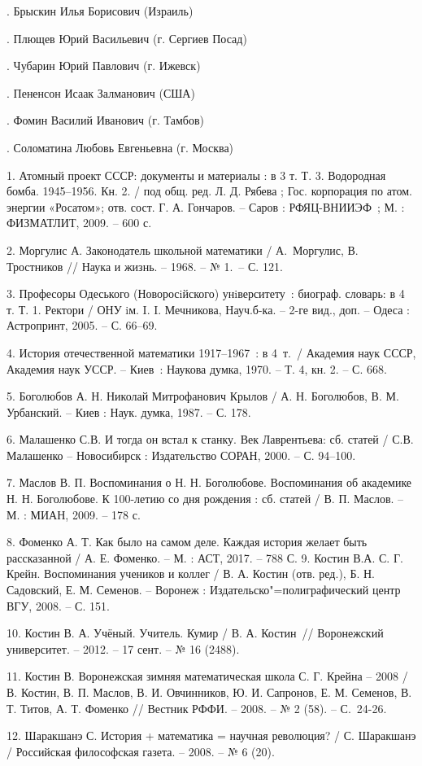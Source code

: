 .	Брыскин Илья Борисович (Израиль)

.	Плющев Юрий Васильевич (г. Сергиев Посад)

.	Чубарин Юрий Павлович (г. Ижевск)

.	Пененсон Исаак Залманович (США)

.	Фомин Василий Иванович (г. Тамбов)

.	Соломатина Любовь Евгеньевна (г. Москва)


\litlist

1.	Атомный проект СССР: документы и материалы : в 3 т. Т. 3. Водородная бомба. 1945–1956. Кн. 2. / под общ. ред. Л. Д. Рябева ; Гос. корпорация по атом. энергии «Росатом»; отв. сост. Г. А. Гончаров. – Саров : РФЯЦ-ВНИИЭФ~; М. : ФИЗМАТЛИТ, 2009. – 600 с.

2.	Моргулис А. Законодатель школьной математики / А.~Моргулис, В. Тростников // Наука и жизнь. – 1968. – № 1.~– С. 121.

3.	Професоры Одеського (Новоросiйского) унiверситету~: биограф. словарь:  в 4 т. Т. 1. Ректори / ОНУ iм. I. I. Мечникова, Науч.б-ка. – 2-ге вид., доп. – Одеса : Астропринт, 2005. – С. 66–69.

4.	История отечественной математики 1917–1967~: в 4~т.~/ Академия наук СССР, Академия наук УССР. – Киев~: Наукова думка, 1970. – Т. 4, кн. 2. – С. 668.

5.	Боголюбов А. Н. Николай Митрофанович Крылов / А. Н. Боголюбов, В. М. Урбанский. – Киев : Наук. думка, 1987. – С. 178.

6.	Малашенко С.В. И тогда он встал к станку. Век Лаврентьева: сб. статей / С.В. Малашенко – Новосибирск : Издательство СОРАН, 2000. –  С. 94–100.

7.	Маслов В. П. Воспоминания о Н. Н. Боголюбове. Воспоминания об академике Н. Н. Боголюбове. К 100-летию со дня рождения : сб. статей / В. П. Маслов. – М. : МИАН, 2009. – 178 с.

8.	Фоменко А. Т. Как было на самом деле. Каждая история желает быть рассказанной / А. Е. Фоменко. – М. : АСТ, 2017. – 788 С.
9.	Костин В.А.  С. Г. Крейн. Воспоминания учеников и коллег / В. А. Костин (отв. ред.), Б. Н. Садовский, Е. М. Семенов. – Воронеж : Издательско"=полиграфический центр ВГУ, 2008. – С. 151.

10.	Костин В. А. Учёный. Учитель. Кумир / В. А. Костин~// Воронежский университет. – 2012. – 17 сент. – № 16 (2488).

11.	Костин В. Воронежская зимняя математическая школа С. Г. Крейна – 2008 / В. Костин, В. П. Маслов, В. И. Овчинников, Ю. И. Сапронов, Е. М. Семенов, В. Т. Титов, А. Т. Фоменко // Вестник РФФИ. – 2008. – № 2 (58). – С.~24-26.

12.	Шаракшанэ С. История + математика = научная революция? / С. Шаракшанэ / Российская философская газета. – 2008. – № 6 (20).


